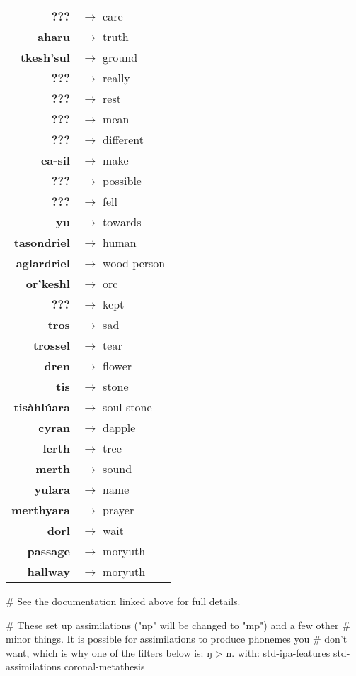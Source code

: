 \begin{tabular}{rl}
\textbf{???} & $\rightarrow$ care \\
\textbf{aharu} & $\rightarrow$ truth \\
\textbf{tkesh'sul} & $\rightarrow$ ground \\
\textbf{???} & $\rightarrow$ really \\
\textbf{???} & $\rightarrow$ rest \\
\textbf{???} & $\rightarrow$ mean \\
\textbf{???} & $\rightarrow$ different \\
\textbf{ea-sil} & $\rightarrow$ make \\
\textbf{???} & $\rightarrow$ possible \\
\textbf{???} & $\rightarrow$ fell \\
\textbf{yu} & $\rightarrow$ towards \\
\textbf{tasondriel} & $\rightarrow$ human \\
\textbf{aglardriel} & $\rightarrow$ wood-person \\
\textbf{or'keshl} & $\rightarrow$ orc \\
\textbf{???} & $\rightarrow$ kept \\
\textbf{tros} & $\rightarrow$ sad \\
\textbf{trossel} & $\rightarrow$ tear \\
\textbf{dren} & $\rightarrow$ flower \\
\textbf{tis} & $\rightarrow$ stone \\
\textbf{tisàhlúara} & $\rightarrow$ soul stone \\
\textbf{cyran} & $\rightarrow$ dapple \\
\textbf{lerth} & $\rightarrow$ tree \\
\textbf{merth} & $\rightarrow$ sound\\
\textbf{yulara}  & $\rightarrow$ name\\
\textbf{merthyara} & $\rightarrow$ prayer\\
\textbf{dorl} & $\rightarrow$ wait\\
\textbf{passage} & $\rightarrow$ moryuth\\
\textbf{hallway} & $\rightarrow$ moryuth\\
\end{tabular}


\iffalse
# See the documentation linked above for full details.

# These set up assimilations ("np" will be changed to "mp") and a few other
# minor things.  It is possible for assimilations to produce phonemes you
# don't want, which is why one of the filters below is: ŋ > n.
with: std-ipa-features std-assimilations coronal-metathesis

